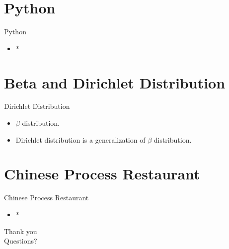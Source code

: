 \documentclass[handout]{beamer}
\begin{document}
\section{Python}
\begin{frame}{Python}
	\begin{itemize}
        \item *
	\end{itemize}
\end{frame}

\section{Beta and Dirichlet Distribution}
\begin{frame}{Dirichlet Distribution}
    \begin{itemize}
        \item $\beta$ distribution.
        \item Dirichlet distribution is a generalization of $\beta$ distribution.
    \end{itemize}
\end{frame}

\section{Chinese Process Restaurant}
\begin{frame}{Chinese Process Restaurant}
    \begin{itemize}
        \item *
    \end{itemize}
\end{frame}

\begin{frame}
\huge{Thank you}\\
\huge{Questions?}\\
\end{frame}
\end{document}
